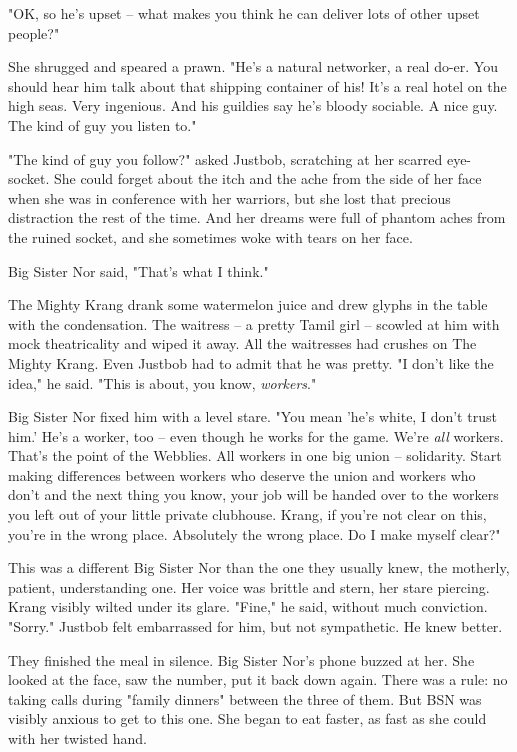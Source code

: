 "OK, so he's upset -- what makes you think he can deliver lots of
other upset people?"

She shrugged and speared a prawn. "He's a natural networker, a real
do-er. You should hear him talk about that shipping container of
his! It's a real hotel on the high seas. Very ingenious. And his
guildies say he's bloody sociable. A nice guy. The kind of guy you
listen to."

"The kind of guy you follow?" asked Justbob, scratching at her
scarred eye-socket. She could forget about the itch and the ache
from the side of her face when she was in conference with her
warriors, but she lost that precious distraction the rest of the
time. And her dreams were full of phantom aches from the ruined
socket, and she sometimes woke with tears on her face.

Big Sister Nor said, "That's what I think."

The Mighty Krang drank some watermelon juice and drew glyphs in the
table with the condensation. The waitress -- a pretty Tamil girl --
scowled at him with mock theatricality and wiped it away. All the
waitresses had crushes on The Mighty Krang. Even Justbob had to
admit that he was pretty. "I don't like the idea," he said. "This
is about, you know, \emph{workers}."

Big Sister Nor fixed him with a level stare. "You mean 'he's white,
I don't trust him.' He's a worker, too -- even though he works for
the game. We're \emph{all} workers. That's the point of the
Webblies. All workers in one big union -- solidarity. Start making
differences between workers who deserve the union and workers who
don't and the next thing you know, your job will be handed over to
the workers you left out of your little private clubhouse. Krang,
if you're not clear on this, you're in the wrong place. Absolutely
the wrong place. Do I make myself clear?"

This was a different Big Sister Nor than the one they usually knew,
the motherly, patient, understanding one. Her voice was brittle and
stern, her stare piercing. Krang visibly wilted under its glare.
"Fine," he said, without much conviction. "Sorry." Justbob felt
embarrassed for him, but not sympathetic. He knew better.

They finished the meal in silence. Big Sister Nor's phone buzzed at
her. She looked at the face, saw the number, put it back down
again. There was a rule: no taking calls during "family dinners"
between the three of them. But BSN was visibly anxious to get to
this one. She began to eat faster, as fast as she could with her
twisted hand.

